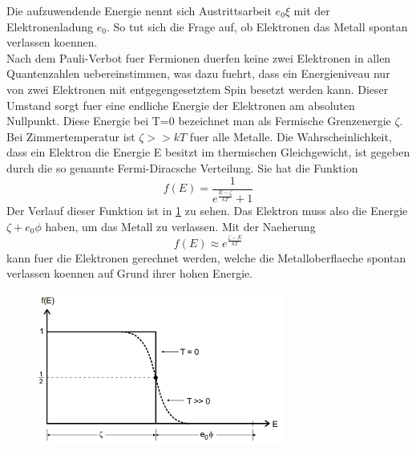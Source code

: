 Die aufzuwendende Energie nennt sich Austrittsarbeit $e_0\xi$ mit der Elektronenladung $e_0$. So tut sich die Frage auf, ob Elektronen das Metall spontan verlassen koennen.\\
Nach dem Pauli-Verbot fuer Fermionen duerfen keine zwei Elektronen in allen Quantenzahlen uebereinstimmen, was dazu fuehrt, dass ein Energieniveau nur von zwei Elektronen mit entgegengesetztem Spin besetzt werden kann. Dieser Umstand sorgt fuer eine endliche Energie der Elektronen am absoluten Nullpunkt. Diese Energie bei T=0 bezeichnet man als Fermische Grenzenergie $\zeta$. Bei Zimmertemperatur ist $\zeta>> kT$ fuer alle Metalle. Die Wahrscheinlichkeit, dass ein Elektron die Energie E besitzt im thermischen Gleichgewicht, ist gegeben durch die so genannte Fermi-Diracsche Verteilung. Sie hat die Funktion 
\begin{equation}
    f(E)=\frac{1}{e^{\frac{E-\zeta}{kT}}+1} \nonumber
\end{equation}
Der Verlauf dieser Funktion ist in \ref{Fig:Verteilung} zu sehen. Das Elektron muss also die Energie $\zeta+e_0\phi$ haben, um das Metall zu verlassen. Mit der Naeherung 
\begin{equation}
    f(E)\approx e^{\frac{\zeta-E}{kT}} \label{Verteilung}
\end{equation}
kann fuer die Elektronen gerechnet werden, welche die Metalloberflaeche spontan verlassen koennen auf Grund ihrer hohen Energie.
\begin{figure}[H]
    \centering
    \captionsetup{justification=centering}
    \includegraphics[height=5cm]{"Fermi_emission.png"}
    \label{Fig:Verteilung}
\end{figure}
